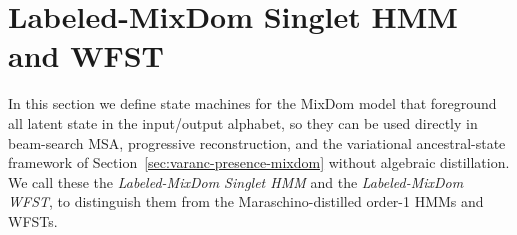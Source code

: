 
\section{Labeled-MixDom Singlet HMM and WFST}
\label{sec:labeled-mixdom}

In this section we define state machines for the MixDom model that
foreground all latent state in the input/output alphabet, so they can
be used directly in beam-search MSA, progressive reconstruction, and
the variational ancestral-state framework of
Section~\ref{sec:varanc-presence-mixdom} without algebraic
distillation.
We call these the \emph{Labeled-MixDom Singlet HMM} and the
\emph{Labeled-MixDom WFST}, to distinguish them from the
Maraschino-distilled order-1 HMMs and WFSTs.

